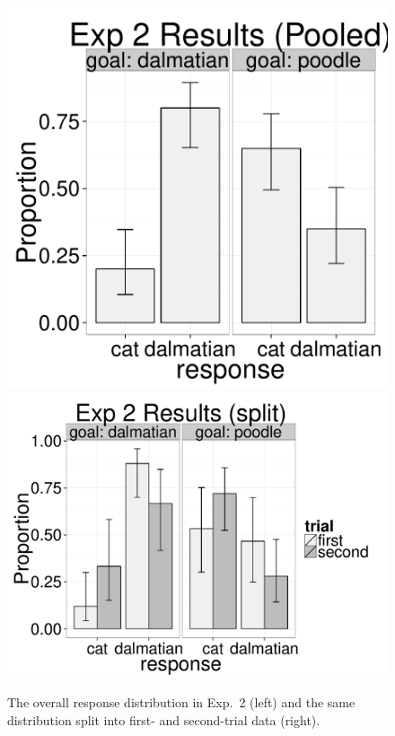 \documentclass[12pt, floatsintext, man]{apa6}
\begin{document}
\begin{figure}[t!]
\begin{center}
\includegraphics[scale=.45]{Exp2Results_all.pdf}
\includegraphics[scale=.45]{Exp2Results_split.pdf}
\end{center}
\vspace{-.5cm}
\caption{The overall response distribution in Exp.~2 (left) and the same distribution split into first- and second-trial data (right).}
\vspace{-.25cm}
\label{fig:exp2res}
\end{figure}
\end{document}
